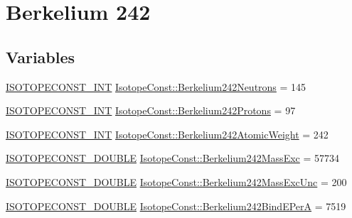 \hypertarget{group___isotope_const-_berkelium-_bk242}{}\section{Berkelium 242}
\label{group___isotope_const-_berkelium-_bk242}
\subsection*{Variables}
\begin{DoxyCompactItemize}
\item 
\mbox{\hyperlink{group___isotope_const-_macros_ga5f18360b3e99483a35c32d789e62621c}{I\+S\+O\+T\+O\+P\+E\+C\+O\+N\+S\+T\+\_\+\+I\+NT}} \mbox{\hyperlink{group___isotope_const-_berkelium-_bk242_ga50944069043a00ef66210ee53b2671de}{Isotope\+Const\+::\+Berkelium242\+Neutrons}} = 145
\item 
\mbox{\hyperlink{group___isotope_const-_macros_ga5f18360b3e99483a35c32d789e62621c}{I\+S\+O\+T\+O\+P\+E\+C\+O\+N\+S\+T\+\_\+\+I\+NT}} \mbox{\hyperlink{group___isotope_const-_berkelium-_bk242_gaeb9d5a4bf9baa0ccb4fe33913ea65580}{Isotope\+Const\+::\+Berkelium242\+Protons}} = 97
\item 
\mbox{\hyperlink{group___isotope_const-_macros_ga5f18360b3e99483a35c32d789e62621c}{I\+S\+O\+T\+O\+P\+E\+C\+O\+N\+S\+T\+\_\+\+I\+NT}} \mbox{\hyperlink{group___isotope_const-_berkelium-_bk242_ga280828555e5edc0ee7bbd07a2e1ddcde}{Isotope\+Const\+::\+Berkelium242\+Atomic\+Weight}} = 242
\item 
\mbox{\hyperlink{group___isotope_const-_macros_ga8f45a7272ce02c0b4c65c44636ed719a}{I\+S\+O\+T\+O\+P\+E\+C\+O\+N\+S\+T\+\_\+\+D\+O\+U\+B\+LE}} \mbox{\hyperlink{group___isotope_const-_berkelium-_bk242_ga836da5a21ada03be93829115e0d94b65}{Isotope\+Const\+::\+Berkelium242\+Mass\+Exc}} = 57734
\item 
\mbox{\hyperlink{group___isotope_const-_macros_ga8f45a7272ce02c0b4c65c44636ed719a}{I\+S\+O\+T\+O\+P\+E\+C\+O\+N\+S\+T\+\_\+\+D\+O\+U\+B\+LE}} \mbox{\hyperlink{group___isotope_const-_berkelium-_bk242_ga24582711699b241c849afee5874393f7}{Isotope\+Const\+::\+Berkelium242\+Mass\+Exc\+Unc}} = 200
\item 
\mbox{\hyperlink{group___isotope_const-_macros_ga8f45a7272ce02c0b4c65c44636ed719a}{I\+S\+O\+T\+O\+P\+E\+C\+O\+N\+S\+T\+\_\+\+D\+O\+U\+B\+LE}} \mbox{\hyperlink{group___isotope_const-_berkelium-_bk242_ga13f1d6deff51e8fbcb3d1d1c6607e80e}{Isotope\+Const\+::\+Berkelium242\+Bind\+E\+PerA}} = 7519
\item 

\end{DoxyCompactItemize}
